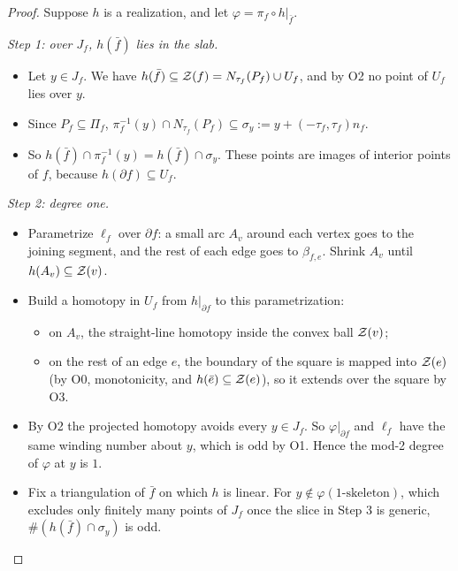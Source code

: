 \begin{proof}
Suppose $h$ is a realization, and let $\varphi=\pi_f\circ h|_{\bar f}$.

\emph{Step 1: over $J_f$, $h(\bar f)$ lies in the slab.}
\begin{itemize}
\item Let $y\in J_f$. We have $h(\bar f)\subseteq\mathcal{Z}(f)=N_{\tau_f}(P_f)\cup U_f$, and by O2 no point of $U_f$ lies over
$y$.
\item Since $P_f\subseteq\Pi_f$, $\pi_f^{-1}(y)\cap N_{\tau_f}(P_f)\subseteq\sigma_y:=y+(-\tau_f,\tau_f)n_f$.
\item So $h(\bar f)\cap\pi_f^{-1}(y)=h(\bar f)\cap\sigma_y$. These points are images of interior points of $f$,
because $h(\partial f)\subseteq U_f$.
\end{itemize}

\emph{Step 2: degree one.}
\begin{itemize}
\item Parametrize $\ell_f$ over $\partial f$: a small arc $A_v$ around each vertex goes to the joining segment, and
the rest of each edge goes to $\beta_{f,e}$. Shrink $A_v$ until $h(A_v)\subseteq\mathcal{Z}(v)$.
\item Build a homotopy in $U_f$ from $h|_{\partial f}$ to this parametrization:
  \begin{itemize}
  \item on $A_v$, the straight-line homotopy inside the convex ball $\mathcal{Z}(v)$;
  \item on the rest of an edge $e$, the boundary of the square is mapped into $\mathcal{Z}(e)$ (by O0, monotonicity, and
  $h(\bar e)\subseteq\mathcal{Z}(e)$), so it extends over the square by O3.
  \end{itemize}
\item By O2 the projected homotopy avoids every $y\in J_f$. So $\varphi|_{\partial f}$ and $\ell_f$ have the same
winding number about $y$, which is odd by O1. Hence the mod-2 degree of $\varphi$ at $y$ is $1$.
\item Fix a triangulation of $\bar f$ on which $h$ is linear. For $y\notin\varphi(\text{1-skeleton})$, which
excludes only finitely many points of $J_f$ once the slice in Step 3 is generic, $\#(h(\bar f)\cap\sigma_y)$ is
odd.
\end{itemize}


\end{proof}
